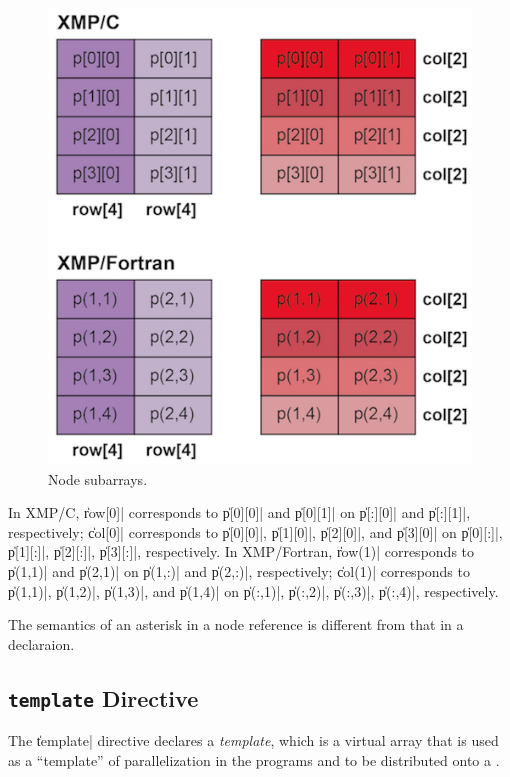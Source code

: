 \begin{figure}
  \centering
  \includegraphics{figs/row_col.png}
  \caption{Node subarrays.}
  \label{fig:partial}
\end{figure}

In XMP/C, \|row[0]| corresponds to \|p[0][0]| and \|p[0][1]| on
\|p[:][0]| and \|p[:][1]|, respectively; 
%
\|col[0]| corresponds to \|p[0][0]|, \|p[1][0]|, \|p[2][0]|, and \|p[3][0]|
on \|p[0][:]|, \|p[1][:]|, \|p[2][:]|, \|p[3][:]|, respectively.
%
In XMP/Fortran, \|row(1)| corresponds to \|p(1,1)| and \|p(2,1)| on
\|p(1,:)| and \|p(2,:)|, respectively;
%
\|col(1)| corresponds to \|p(1,1)|, \|p(1,2)|, \|p(1,3)|, and \|p(1,4)|
on \|p(:,1)|, \|p(:,2)|, \|p(:,3)|, \|p(:,4)|, respectively.

\begin{mynote}
  The semantics of an asterisk in a node reference is different from
  that in a declaraion.
\end{mynote}


\subsection{{\tt template} Directive}

The \|template| directive declares a {\it template}, which is a virtual
array that is used as a ``template'' of parallelization in the programs
and to be distributed onto a {\narray}.

